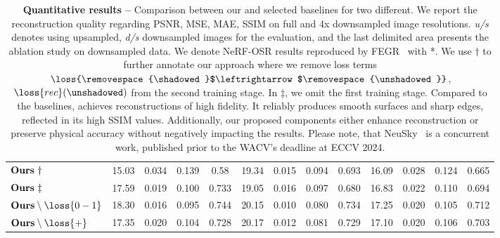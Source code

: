 \begin{table}[t]
{\begin{tabular}{lcccccccccccc}
      \midrule
      $\text{\textbf{Ours}}~\dagger$                & 15.03                             & 0.034                             & 0.139                             & 0.58            & 19.34           & 0.015            & 0.094            & 0.693           & 16.09           & 0.028            & 0.124            & 0.665           \\
      $\text{\textbf{Ours}}~\ddagger$               & 17.59                             & 0.019                             & 0.100                             & 0.733           & 19.05           & 0.016            & 0.097            & 0.680           & 16.83           & 0.022            & 0.110            & 0.694           \\
      $\text{\textbf{Ours}}\setminus\loss{0-1}$     & 18.30                             & 0.016                             & 0.095                             & 0.744           & 20.15           & 0.010            & 0.080            & 0.734           & 17.25           & 0.020            & 0.105            & 0.712           \\
      $\text{\textbf{Ours}}\setminus\loss{+}$       & 17.35                             & 0.020                             & 0.104                             & 0.728           & 20.17           & 0.012            & 0.081            & 0.729           & 17.10           & 0.020            & 0.106            & 0.703           \\

      \bottomrule
    \end{tabular}
  }
  \caption[Quantitative results between \lumigauss and chosen baselines]{\textbf{Quantitative results --}
    Comparison between our \lumigauss and selected baselines for two different.
    We report the reconstruction quality regarding PSNR, MSE, MAE, SSIM on full
    and 4x downsampled image resolutions.
    \textit{u/s} denotes using upsampled, \textit{d/s} downsampled images for the evaluation, and the last delimited area presents the ablation study on downsampled data.
    We denote NeRF-OSR \cite{rudnev2022nerfosr} results reproduced by
    FEGR~\cite{wang2023fegr} with *.
    We use $\dagger$ to further annotate our approach where we remove loss terms
    $\loss{\removespace{\shadowed}$\leftrightarrow$\removespace{\unshadowed}}$,
    $\loss{rec}(\unshadowed)$ from the second training stage.
    In $\ddagger$, we omit the first training stage.
    Compared to the baselines, \lumigauss achieves reconstructions of high
    fidelity.
    It reliably produces smooth surfaces and sharp edges, reflected in its high
    SSIM values.
    Additionally, our proposed components either enhance reconstruction or
    preserve physical accuracy without negatively impacting the results.
    Please note, that NeuSky~\cite{gardner2023neusky} is a concurrent work,
    published prior to the WACV's deadline at ECCV 2024.
  }

  \label{tab:lumigauss-results_osr_eval}
\end{table}
